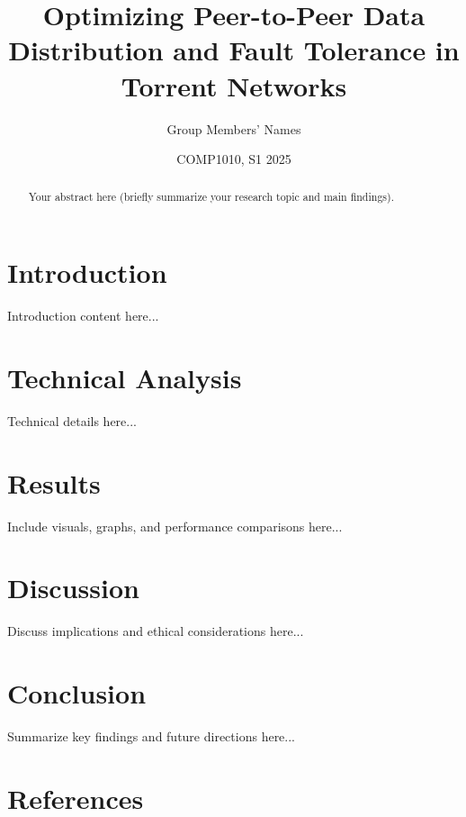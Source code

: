 \documentclass[a0,portrait]{a0poster}
\title{Optimizing Peer-to-Peer Data Distribution and Fault Tolerance in Torrent Networks}
\author{Group Members' Names}
\date{COMP1010, S1 2025}
\begin{document}
\maketitle

\begin{abstract}
Your abstract here (briefly summarize your research topic and main findings).
\end{abstract}

\begin{multicols}{2}

\section{Introduction}
Introduction content here...

\section{Technical Analysis}
Technical details here...

\section{Results}
Include visuals, graphs, and performance comparisons here...

\section{Discussion}
Discuss implications and ethical considerations here...

\section{Conclusion}
Summarize key findings and future directions here...

\section*{References}



\end{multicols}
\end{document}
